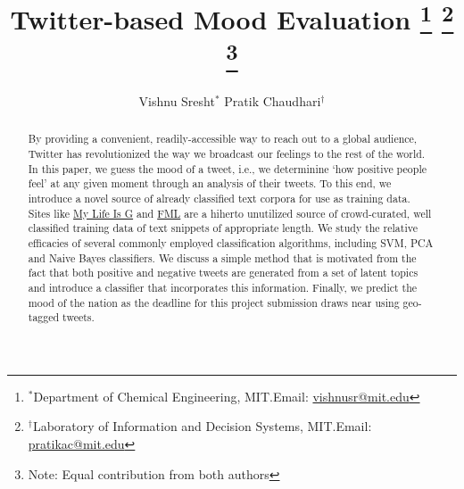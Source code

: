 \documentclass[11pt, letterpaper, conference, final, twocolumn]{ieeeconf}
\begin{document}
\title{\bf Twitter-based Mood Evaluation
	\thanks{$^*$Department of Chemical Engineering, MIT.\newline Email: \href{mailto:vishnusr@mit.edu}{vishnusr@mit.edu}}
	\thanks{$^\dag$Laboratory of Information and Decision Systems, MIT.\newline Email: \href{mailto:pratikac@mit.edu}{pratikac@mit.edu}}
	\thanks{Note: Equal contribution from both authors}
}
\author{Vishnu Sresht$^*$ \qquad Pratik Chaudhari$^\dag$}
\maketitle

\begin{abstract}
\small{By providing a convenient, readily-accessible way to reach out to a
    global audience, Twitter has revolutionized the way we broadcast our
    feelings to the rest of the world. In this paper, we guess the mood of a
    tweet, i.e., we determinine `how positive people feel' at any given moment
    through an analysis of their tweets. To this end, we introduce a novel
    source of already classified text corpora for use as training data. Sites
    like \href{http://mylifeisg.com}{My Life Is G} and
    \href{http://fmylife.com}{FML} are a hiherto unutilized source of
    crowd-curated, well classified training data of text snippets of
    appropriate length. We study the relative efficacies of several commonly
    employed classification algorithms, including SVM, PCA
    and Naive Bayes classifiers. We discuss a
    simple method that is motivated from the fact that both positive and
    negative tweets are generated from a set of latent topics and introduce a
    classifier that incorporates this information. Finally, we predict the mood
    of the nation as the deadline for this project submission draws near using
    geo-tagged tweets.}
\end{abstract}
\end{document}
